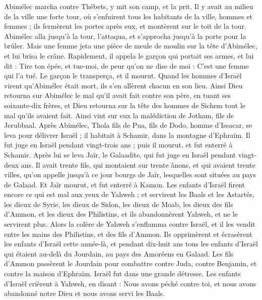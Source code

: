 \begin{multicols}{2}
Abimélec marcha contre Thébets, y mit son camp, et la prit.
Il y avait au milieu de la ville une forte tour, où s'enfuirent tous les habitants de la ville, hommes et femmes ; ils fermèrent les portes après eux, et montèrent sur le toit de la tour.
Abimélec alla jusqu'à la tour, l'attaqua, et s'approcha jusqu'à la porte pour la brûler.
Mais une femme jeta une pièce de meule de moulin sur la tête d'Abimélec, et lui brisa le crâne.
Rapidement, il appela le garçon qui portait ses armes, et lui dit : Tire ton épée, et tue-moi, de peur qu'on ne dise de moi : C'est une femme qui l'a tué. Le garçon le transperça, et il mourut.
Quand les hommes d'Israël virent qu'Abimélec était mort, ils s'en allèrent chacun en son lieu.
Ainsi Dieu retourna sur Abimélec le mal qu'il avait fait contre son père, en tuant ses soixante-dix frères,
et Dieu retourna sur la tête des hommes de Sichem tout le mal qu'ils avaient fait. Ainsi vint sur eux la malédiction de Jotham, fils de Jerubbaal.
\VerseOne{}Après Abimélec, Thola fils de Pua, fils de Dodo, homme d'Issacar, se leva pour délivrer Israël ; il habitait à Schamir, dans la montagne d'Ephraïm.
Il fut juge en Israël pendant vingt-trois ans ; puis il mourut, et fut enterré à Schamir.
Après lui se leva Jaïr, le Galaadite, qui fut juge en Israël pendant vingt-deux ans.
Il avait trente fils, qui montaient sur trente ânons, et qui avaient trente villes, qu'on appelle jusqu'à ce jour bourgs de Jaïr, lesquelles sont situées au pays de Galaad.
Et Jaïr mourut, et fut enterré à Kamon.
Les enfants d'Israël firent encore ce qui est mal aux yeux de Yahweh ; et servirent les Baals et les Astartés, les dieux de Syrie, les dieux de Sidon, les dieux de Moab, les dieux des fils d'Ammon, et les dieux des Philistins, et ils abandonnèrent Yahweh, et ne le servirent plus.
Alors la colère de Yahweh s'enflamma contre Israël, et il les vendit entre les mains des Philistins, et des fils d'Ammon.
Ils opprimèrent et écrasèrent les enfants d'Israël cette année-là, et pendant dix-huit ans tous les enfants d'Israël qui étaient au-delà du Jourdain, au pays des Amoréens en Galaad.
Les fils d'Ammon passèrent le Jourdain pour combattre contre Juda, contre Benjamin, et contre la maison d'Ephraïm. Israël fut dans une grande détresse.
Les enfants d'Israël crièrent à Yahweh, en disant : Nous avons péché contre toi, et nous avons abandonné notre Dieu et nous avons servi les Baals.

\end{multicols}
